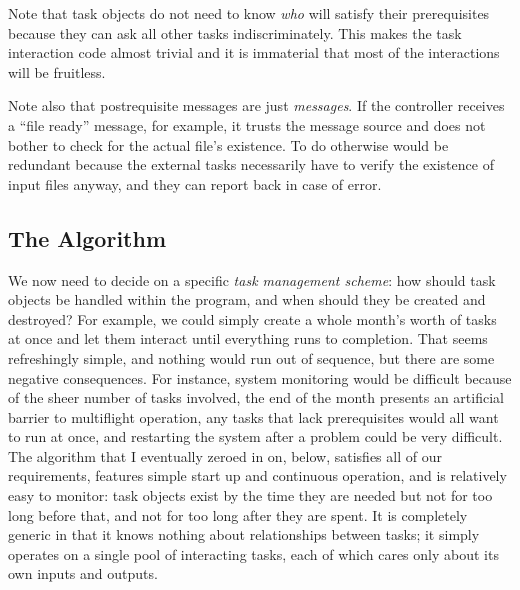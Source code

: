\documentclass[12pt]{article}
\begin{document}
Note that task objects do not need to know {\em who} will satisfy their
prerequisites because they can ask all other tasks indiscriminately.
This makes the task interaction code almost trivial and it is immaterial
that most of the interactions will be fruitless. 

Note also that postrequisite messages are just {\em messages}. If the
controller receives a ``file ready'' message, for example, it trusts the
message source and does not bother to check for the actual file's
existence. To do otherwise would be redundant because the external tasks
necessarily have to verify the existence of input files anyway, and they
can report back in case of error.


\subsection{The Algorithm}

We now need to decide on a specific {\em task management scheme}: how
should task objects be handled within the program, and when should they
be created and destroyed?  For example, we could simply create a whole
month's worth of tasks at once and let them interact until everything
runs to completion. That seems refreshingly simple, and nothing would
run out of sequence, but there are some negative consequences. For
instance, system monitoring would be difficult because of the sheer
number of tasks involved, the end of the month presents an artificial
barrier to multiflight operation, any tasks that lack prerequisites
would all want to run at once, and restarting the system after a problem
could be very difficult. The algorithm that I eventually zeroed in on,
below, satisfies all of our requirements, features simple start up and
continuous operation, and is relatively easy to monitor: task objects
exist by the time they are needed but not for too long before that, and
not for too long after they are spent. It is completely generic in that
it knows nothing about relationships between tasks; it simply operates
on a single pool of interacting tasks, each of which cares only about
its own inputs and outputs.  
\end{document}

